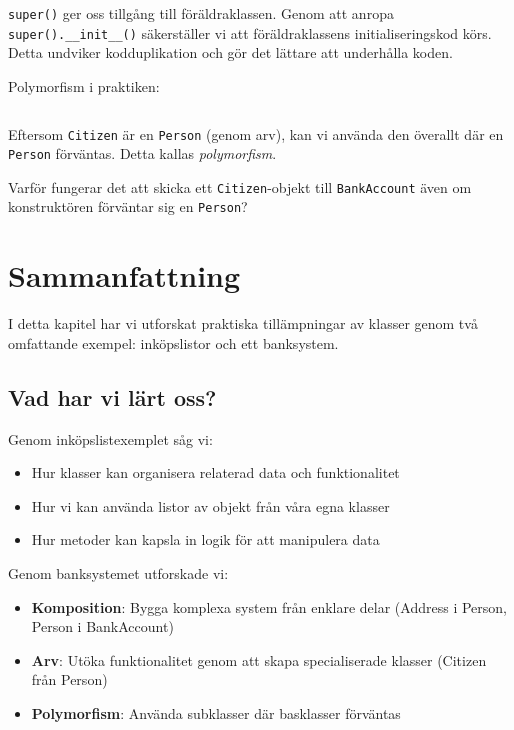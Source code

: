 \texttt{super()} ger oss tillgång till föräldraklassen. Genom att 
anropa \texttt{super().__init__()} säkerställer vi att 
föräldraklassens initialiseringskod körs. Detta undviker kodduplikation och 
gör det lättare att underhålla koden.

\begin{frame}[fragile]
  \begin{example}
    Polymorfism i praktiken:
    \inputminted[linenos,firstline=79,lastline=85]{python}{examples/bank.py}
  \end{example}
\end{frame}

Eftersom \texttt{Citizen} är en \texttt{Person} 
(genom arv), kan vi använda den överallt där en \texttt{Person} 
förväntas. Detta kallas \emph{polymorfism}.

\begin{exercise}
  Varför fungerar det att skicka ett \texttt{Citizen}-objekt till 
  \texttt{BankAccount} även om konstruktören förväntar sig en 
  \texttt{Person}?
\end{exercise}

\section{Sammanfattning}

I detta kapitel har vi utforskat praktiska tillämpningar av klasser genom 
två omfattande exempel: inköpslistor och ett banksystem.

\subsection{Vad har vi lärt oss?}

Genom inköpslistexemplet såg vi:
\begin{itemize}
  \item Hur klasser kan organisera relaterad data och funktionalitet
  \item Hur vi kan använda listor av objekt från våra egna klasser
  \item Hur metoder kan kapsla in logik för att manipulera data
\end{itemize}

Genom banksystemet utforskade vi:
\begin{itemize}
  \item \textbf{Komposition}: Bygga komplexa system från enklare delar 
    (Address i Person, Person i BankAccount)
  \item \textbf{Arv}: Utöka funktionalitet genom att skapa specialiserade 
    klasser (Citizen från Person)
  \item \textbf{Polymorfism}: Använda subklasser där basklasser förväntas
\end{itemize}

